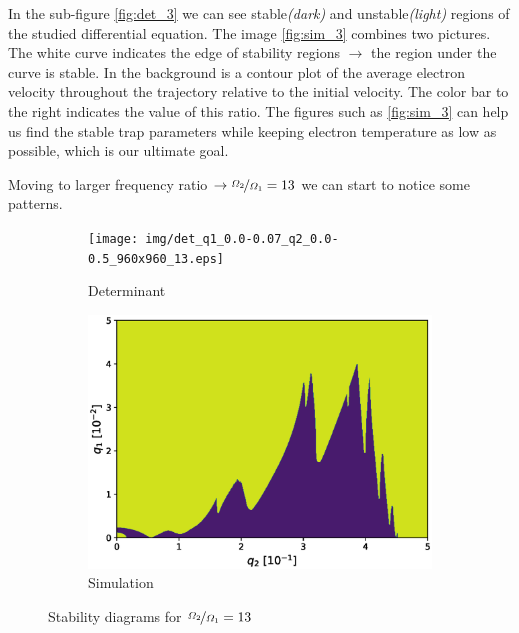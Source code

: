 In the sub-figure \ref{fig:det_3} we can see stable\textit{(dark)} and unstable\textit{(light)} regions of the studied differential equation. The image \ref{fig:sim_3} combines two pictures. The white curve indicates the edge of stability regions $\rightarrow$ the region under the curve is stable. In the background is a contour plot of the average electron velocity throughout the trajectory relative to the initial velocity. The color bar to the right indicates the value of this ratio. The figures such as \ref{fig:sim_3} can help us find the stable trap parameters while keeping electron temperature as low as possible, which is our ultimate goal. 

Moving to larger frequency ratio $\rightarrow \nicefrac{\Omega_2}{\Omega_1} = 13$ we can start to notice some patterns.

\begin{figure}[H]
\begin{subfigure}{.5\textwidth}
  \centering
  \texttt{[image: img/det\_q1\_0.0-0.07\_q2\_0.0-0.5\_960x960\_13.eps]}
  \caption{Determinant}
  \label{fig:det_13}
\end{subfigure}%
\begin{subfigure}{.5\textwidth}
  \centering
  \includegraphics[width=\linewidth]{img/0_ions_1_electrons_q1_0.0-0.05_q2_0.0-0.5_640x640_13.eps}  
  \caption{Simulation}
  \label{fig:sim_13}
\end{subfigure}
\caption{Stability diagrams for $\nicefrac{\Omega_2}{\Omega_1} = 13$}
\label{fig:stabil-eta=13}
\end{figure}

